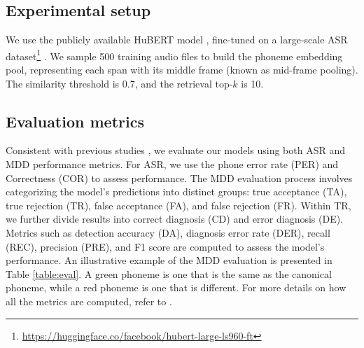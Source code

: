 \documentclass{article}
\begin{document}
\subsection{Experimental setup}\label{sub:exp-setup}
We use the publicly available HuBERT model \cite{hubert}, fine-tuned on a large-scale ASR dataset\footnote{\url{https://huggingface.co/facebook/hubert-large-ls960-ft}}
. We sample 500 training audio files to build the phoneme embedding pool, representing each span with its middle frame (known as mid-frame pooling). The similarity threshold is 0.7, and the retrieval top-$k$ is 10.

\begin{table}[h!]
\centering
\caption{MDD evaluation example}
\label{table:eval}
\end{table}
\subsection{Evaluation metrics}
Consistent with previous studies \cite{sed-mdd,cnn-rnn-ctc,AFullText-Dependent,APL}, we evaluate our models using both ASR and MDD performance metrics. For ASR, we use the phone error rate (PER) and Correctness (COR) to assess performance. The MDD evaluation process involves categorizing the model's predictions into distinct groups: true acceptance (TA), true rejection (TR), false acceptance (FA), and false rejection (FR). Within TR, we further divide results into correct diagnosis (CD) and error diagnosis (DE). Metrics such as detection accuracy (DA), diagnosis error rate (DER), recall (REC), precision (PRE), and F1 score are computed to assess the model's performance. An illustrative example of the MDD evaluation is presented in Table \ref{table:eval}. A green phoneme is one that is the same as the canonical phoneme, while a red phoneme is one that is different. For more details on how all the metrics are computed, refer to \cite{APL}.
\end{document}
